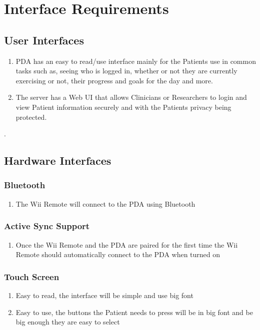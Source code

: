 \documentclass{article}
\begin{document}
\section{Interface Requirements}

\subsection{User Interfaces}
\begin {enumerate}
\item PDA has an easy to read/use interface mainly for the Patients use in common tasks such as, seeing who is logged in, whether or not they are currently exercising or not, their progress and goals for the day and more.
\item The server has a Web UI that allows Clinicians or Researchers to login and view Patient information securely and with the Patients privacy being protected.
\end {enumerate}.


\subsection{Hardware Interfaces}

\subsubsection{Bluetooth}
\begin{enumerate}
\item The Wii Remote will connect to the PDA using Bluetooth
\end{enumerate}

\subsubsection{Active Sync Support}
\begin{enumerate}
\item Once the Wii Remote and the PDA are paired for the first time the Wii Remote should automatically connect to the PDA when turned on
\end{enumerate}

\subsubsection{Touch Screen}
\begin{enumerate}
\item Easy to read, the interface will be simple and use big font 
\item Easy to use, the buttons the Patient needs to press will be in big font and be big enough they are easy to select

\end{enumerate}
\end{document}
